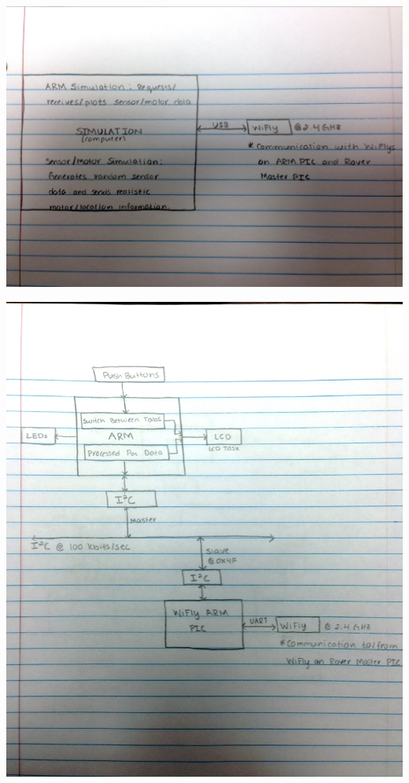 








\begin{center}
	\includegraphics[scale=0.6]{Images/Block1}
\end{center}

\begin{center}
	\includegraphics[scale=0.8]{Images/Block2}
\end{center}

